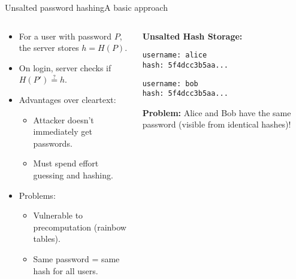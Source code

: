 \documentclass[aspectratio=169, lualatex, handout]{beamer}
\begin{document}
\begin{frame}{Unsalted password hashing}{A basic approach}
	\begin{columns}[c]
		\begin{column}{0.55\textwidth}
			\begin{itemize}
				\item For a user with password $P$, the server stores $h = H(P)$.
				\item On login, server checks if $H(P') \stackrel{?}{=} h$.
				\item Advantages over cleartext:
				      \begin{itemize}
					      \item Attacker doesn't immediately get passwords.
					      \item Must spend effort guessing and hashing.
				      \end{itemize}
				\item Problems:
				      \begin{itemize}
					      \item Vulnerable to precomputation (rainbow tables).
					      \item Same password = same hash for all users.
				      \end{itemize}
			\end{itemize}
		\end{column}
		\begin{column}{0.45\textwidth}
			\begin{tcolorbox}[colback=black!5!white,colframe=ciphergray]
				\textbf{Unsalted Hash Storage:}

				\vspace{0.2cm}

				\texttt{username: alice}\\
				\texttt{hash: 5f4dcc3b5aa...}

				\vspace{0.2cm}

				\texttt{username: bob}\\
				\texttt{hash: 5f4dcc3b5aa...}

				\vspace{0.3cm}

				\textcolor{cipherprimary}{\textbf{Problem:} \small Alice and Bob have the same password (visible from identical hashes)!}
			\end{tcolorbox}
		\end{column}
	\end{columns}
\end{frame}
\end{document}
